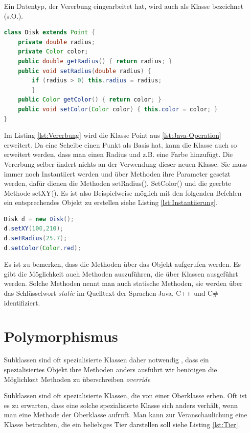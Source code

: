 \documentclass[
	12pt, %
	a4paper,
	listof=totoc, %
	bibliography=totoc, %
	numbers=noenddot, %
	ngerman, %
	headsepline, %
	oneside %
	]{scrbook} %
\begin{document}
Ein Datentyp, der Vererbung eingearbeitet hat, wird auch als Klasse bezeichnet (s.O.).

\begin{lstlisting}[language=Java, caption=Erweiterung der Point Klasse aus Listing \ref{lst:Java-Operation} \cite{OOPL}, label={lst:Vererbung}]
class Disk extends Point {
	private double radius;
	private Color color;
	public double getRadius() { return radius; }
	public void setRadius(double radius) {
		if (radius > 0) this.radius = radius;
		}
	public Color getColor() { return color; }
	public void setColor(Color color) { this.color = color; }
}
\end{lstlisting}

Im Listing \ref{lst:Vererbung} wird die Klasse \glqq Point\grqq{}  aus \ref{lst:Java-Operation} erweitert. Da eine Scheibe einen Punkt als Basis hat, kann die Klasse auch so erweitert werden, dass man einen Radius und z.B. eine Farbe hinzufügt. Die Vererbung selber ändert nichts an der Verwendung dieser neuen Klasse. Sie muss immer noch Instantiiert werden und über Methoden ihre Parameter gesetzt werden, dafür dienen die Methoden setRadius(), SetColor() und die geerbte Methode setXY(). Es ist also Beispielweise möglich mit den folgenden Befehlen ein entsprechendes Objekt zu erstellen siehe Listing \ref{lst:Instantiierung}.

\begin{lstlisting}[language=Java, caption=Instantiierung der Klasse Disk \cite{OOPL}, label={lst:Instantiierung}]
Disk d = new Disk();
d.setXY(100,210);
d.setRadius(25.7);
d.setColor(Color.red);
\end{lstlisting}

Es ist zu bemerken, dass die Methoden über das Objekt aufgerufen werden. Es gibt die Möglichkeit auch Methoden auszuführen, die über Klassen ausgeführt werden. Solche Methoden nennt man auch statische Methoden, sie werden über das Schlüsselwort \emph{static} im Quelltext der Sprachen Java, C++ und C\# identifiziert.

\section{Polymorphismus}
Subklassen sind oft spezialisierte Klassen
daher notwendig , dass ein spezialisiertes Objekt ihre Methoden anders ausführt
wir benötigen die Möglichkeit Methoden zu überschreiben \emph{override}

Subklassen sind oft spezialisierte Klassen, die von einer Oberklasse erben. Oft ist es zu erwarten, dass eine solche spezialisierte Klasse sich anders verhält, wenn man eine Methode der Oberklasse aufruft. Man kann zur Veranschaulichung eine Klasse betrachten, die ein beliebiges Tier darstellen soll siehe Listing \ref{lst:Tier}.
\end{document}
